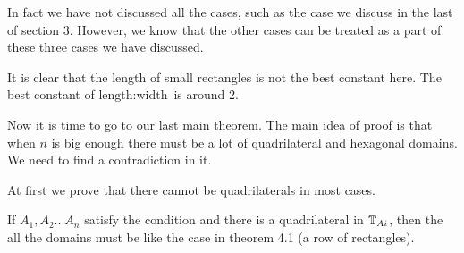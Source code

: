 \begin{rem}
	In fact we have not discussed all the cases, such as the case
	we discuss in the last of section 3. However, we know that the other cases 
	can be treated as a part of these three cases we have discussed.
\end{rem}

\begin{rem}
	It is clear that the length of small rectangles is not the best 
	constant here. The best constant of $\text{length}:\text{width}$ is around 2.
\end{rem}

Now it is time to go to our last main theorem. The main idea of proof 
is that when $n$ is big enough there must be a lot of quadrilateral 
and hexagonal domains. We need to find a contradiction in it.

At first we prove that there cannot be quadrilaterals in most cases.

\begin{thm}
	If $A_1, A_2 ... A_n$ satisfy the condition and there is 
	a quadrilateral in $\mathbb{T}_{Ai}$, then the all the domains 
	must be like the case in theorem 4.1 (a row of rectangles).
\end{thm}

